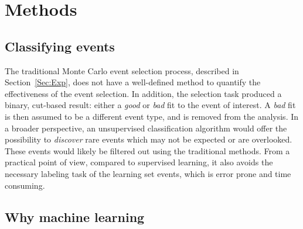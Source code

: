 \documentclass[preprint,12pt]{elsarticle}
\begin{document}
\section{Methods}\label{sec:methods}

\subsection{Classifying  events} 
The traditional Monte Carlo event selection process, described in Section~\ref{Sec:Exp}, does not have a well-defined method to quantify the effectiveness of the event selection.
In addition, the selection task produced a binary, cut-based result: either a {\em good} or {\em bad} fit to the event of interest. A {\em bad} fit is then assumed to be a different event type, and is removed from the analysis. %
In a broader perspective, an unsupervised classification algorithm would offer the possibility to {\em discover} rare events which may not be expected or are overlooked. These events would likely be filtered out using the traditional methods. From a practical point of view, compared to supervised learning, it also avoids the necessary labeling task of the learning set events, which is error prone and time consuming.

\subsection{Why machine learning}
\end{document}
